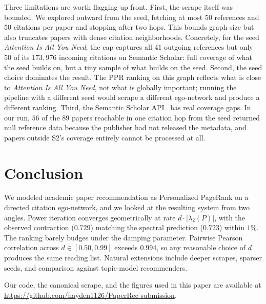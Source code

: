 \documentclass[conference]{IEEEtran}
\begin{document}
Three limitations are worth flagging up front. First, the
scrape itself was bounded. We explored outward from the seed, fetching at most
$50$ references and $50$ citations per paper and stopping after
two hops. This
bounds graph size but also truncates papers with dense
citation neighborhoods. Concretely, for the seed
\emph{Attention Is All You Need}, the cap captures all $41$
outgoing references but only $50$ of its $173{,}976$ incoming
citations on Semantic Scholar: full coverage of what the seed
builds on, but a tiny sample of what builds on the seed. Second, the seed choice dominates the
result. The PPR ranking on this graph reflects what is close to
\emph{Attention Is All You Need}, not what is globally important;
running the pipeline with a different seed would scrape a
different ego-network and produce a different ranking. Third,
the Semantic Scholar API~\cite{semanticscholarapi} has real
coverage gaps. In our run,
$56$ of the $89$ papers reachable in one citation hop from the
seed returned null reference data because the publisher had
not released the metadata, and papers outside S2's coverage
entirely cannot be processed at all.

\section{Conclusion}
\label{sec:conclusion}

We modeled academic paper recommendation as Personalized
PageRank on a directed citation ego-network, and we looked at
the resulting system from two angles. Power iteration
converges geometrically at rate $d \cdot |\lambda_2(P)|$, with
the observed contraction ($0.729$) matching the spectral
prediction ($0.723$) within $1\%$. The ranking barely budges under the damping parameter. Pairwise Pearson correlation across
$d \in [0.50, 0.99]$ exceeds $0.994$, so any reasonable choice
of $d$ produces the same reading list. Natural extensions
include deeper scrapes, sparser seeds, and comparison against
topic-model recommenders.

Our code, the canonical scrape, and the figures used in this
paper are available at
\url{https://github.com/hayden1126/PaperRec-submission}.

\balance


\end{document}

